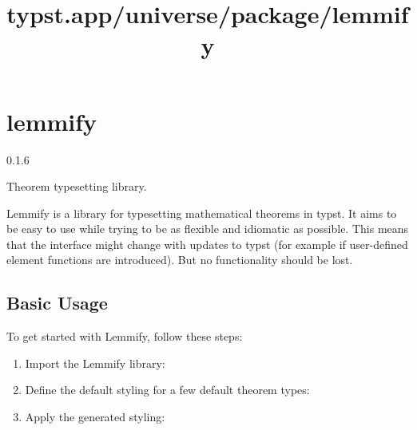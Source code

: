 \title{typst.app/universe/package/lemmify}

\label{banner}
\section{lemmify}\label{lemmify}

{ 0.1.6 }

Theorem typesetting library.

\label{readme}
Lemmify is a library for typesetting mathematical theorems in typst. It
aims to be easy to use while trying to be as flexible and idiomatic as
possible. This means that the interface might change with updates to
typst (for example if user-defined element functions are introduced).
But no functionality should be lost.

\subsection{Basic Usage}\label{basic-usage}

To get started with Lemmify, follow these steps:

\begin{enumerate}
\tightlist
\item
  Import the Lemmify library:
\end{enumerate}

\begin{Shaded}
\begin{Highlighting}[]
\end{Highlighting}
\end{Shaded}

\begin{enumerate}
\setcounter{enumi}{1}
\tightlist
\item
  Define the default styling for a few default theorem types:
\end{enumerate}

\begin{Shaded}
\begin{Highlighting}[]
\end{Highlighting}
\end{Shaded}

\begin{enumerate}
\setcounter{enumi}{2}
\tightlist
\item
  Apply the generated styling:
\end{enumerate}

